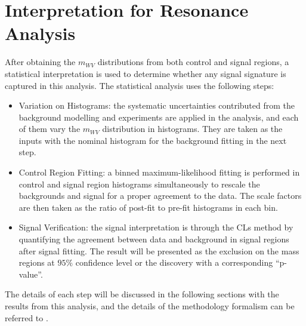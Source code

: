 \chapter{Interpretation for Resonance Analysis}
\label{Ch:resonance_stat}
After obtaining the $m_{WV}$ distributions from both control and signal regions, a statistical interpretation is used to determine whether any signal signature is captured in this analysis. The statistical analysis uses the following steps:

\begin{itemize}
	\item{Variation on Histograms}: the systematic uncertainties contributed from the background modelling and experiments are applied in the analysis, and each of them vary the $m_{WV}$ distribution in histograms. They are taken as the inputs with the nominal histogram for the background fitting in the next step.

	\item{Control Region Fitting}: a binned maximum-likelihood fitting is performed in control and signal region histograms simultaneously to rescale the backgrounds and signal for a proper agreement to the data. The scale factors are then taken as the ratio of post-fit to pre-fit histograms in each bin. 
	
	\item{Signal Verification}: the signal interpretation is through the CLs method by quantifying the agreement between data and background in signal regions after signal fitting. The result will be presented as the exclusion on the mass regions at $95\%$ confidence level or the discovery with a corresponding ``p-value''.
\end{itemize}
The details of each step will be discussed in the following sections with the results from this analysis, and the details of the methodology formalism can be referred to \cite{StatisticsData}.
